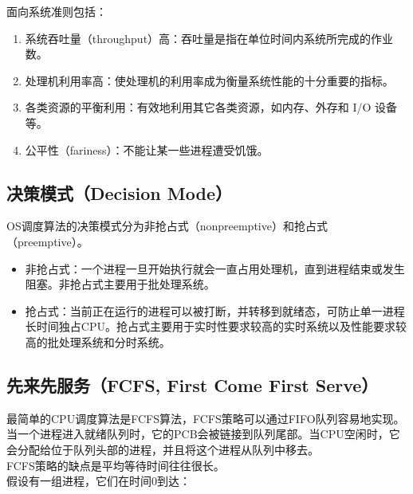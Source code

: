 面向系统准则包括：

\begin{enumerate}
	\item 系统吞吐量（throughput）高：吞吐量是指在单位时间内系统所完成的作业数。

	\item 处理机利用率高：使处理机的利用率成为衡量系统性能的十分重要的指标。

	\item 各类资源的平衡利用：有效地利用其它各类资源，如内存、外存和 I/O 设备等。

	\item 公平性（fariness）：不能让某一些进程遭受饥饿。
\end{enumerate}

\subsection{决策模式（Decision Mode）}

OS调度算法的决策模式分为非抢占式（nonpreemptive）和抢占式（preemptive）。

\begin{itemize}
	\item 非抢占式：一个进程一旦开始执行就会一直占用处理机，直到进程结束或发生阻塞。非抢占式主要用于批处理系统。

	\item 抢占式：当前正在运行的进程可以被打断，并转移到就绪态，可防止单一进程长时间独占CPU。抢占式主要用于实时性要求较高的实时系统以及性能要求较高的批处理系统和分时系统。
\end{itemize}

\subsection{先来先服务（FCFS, First Come First Serve）}

最简单的CPU调度算法是FCFS算法，FCFS策略可以通过FIFO队列容易地实现。当一个进程进入就绪队列时，它的PCB会被链接到队列尾部。当CPU空闲时，它会分配给位于队列头部的进程，并且将这个进程从队列中移去。 \\

FCFS策略的缺点是平均等待时间往往很长。 \\

假设有一组进程，它们在时间0到达：

\begin{table}[H]
	\centering
\end{table}

